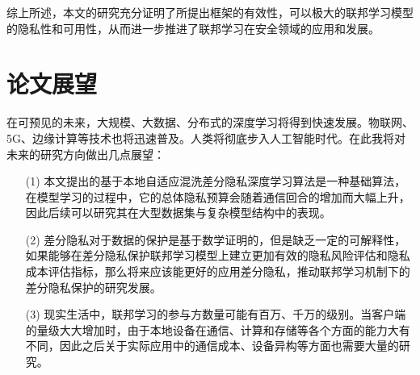 综上所述，本文的研究充分证明了所提出框架的有效性，可以极大的联邦学习模型的隐私性和可用性，从而进一步推进了联邦学习在安全领域的应用和发展。

\section{论文展望}
在可预见的未来，大规模、大数据、分布式的深度学习将得到快速发展。物联网、5G、边缘计算等技术也将迅速普及。人类将彻底步入人工智能时代。在此我将对未来的研究方向做出几点展望：
\begin{enumerate}
	\item [(1)] 本文提出的基于本地自适应混洗差分隐私深度学习算法是一种基础算法，在模型学习的过程中，它的总体隐私预算会随着通信回合的增加而大幅上升，因此后续可以研究其在大型数据集与复杂模型结构中的表现。
	\item [(2)] 差分隐私对于数据的保护是基于数学证明的，但是缺乏一定的可解释性，如果能够在差分隐私保护联邦学习模型上建立更加有效的隐私风险评估和隐私成本评估指标，那么将来应该能更好的应用差分隐私，推动联邦学习机制下的差分隐私保护的研究发展。
	\item [(3)] 现实生活中，联邦学习的参与方数量可能有百万、千万的级别。当客户端的量级大大增加时，由于本地设备在通信、计算和存储等各个方面的能力大有不同，因此之后关于实际应用中的通信成本、设备异构等方面也需要大量的研究。
\end{enumerate}

